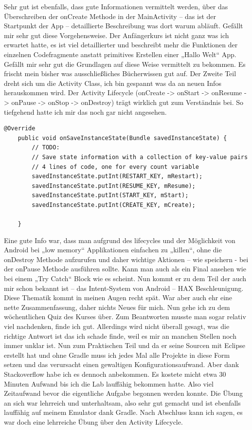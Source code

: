 \documentclass[12pt,a4paper,bibliography=totocnumbered,listof=totocnumbered]{scrartcl}
\begin{document}
Sehr gut ist ebenfalls, dass gute Informationen vermittelt werden, über das Überschreiben der onCreate Methode in der MainActivity – das ist der Startpunkt der App – detaillierte Beschreibung was dort warum abläuft. Gefällt mir sehr gut diese Vorgehensweise. 
Der Anfängerkurs ist nicht ganz was ich erwartet hatte, es ist viel detaillierter und beschreibt mehr die Funktionen der einzelnen Codefragmente anstatt primitives Erstellen einer „Hallo Welt“ App. Gefällt mir sehr gut die Grundlagen auf diese Weise vermittelt zu bekommen. Es frischt mein bisher was ausschließliches Bücherwissen gut auf. 
Der Zweite Teil dreht sich um die Activity Class, ich bin gespannt was da an neuen Infos herauskommen wird. Der Activity Lifecycle (onCreate -> onStart -> onResume -> onPause -> onStop -> onDestroy) trägt wirklich gut zum Verständnis bei. So tiefgehend hatte ich mir das noch gar nicht angesehen. 

\vspace{1em}
\begin{lstlisting}[caption=Activity Lifecycle Beispiel, label=lst:Activity Lifecycle]
@Override
    public void onSaveInstanceState(Bundle savedInstanceState) {
        // TODO:
        // Save state information with a collection of key-value pairs
        // 4 lines of code, one for every count variable
        savedInstanceState.putInt(RESTART_KEY, mRestart);
        savedInstanceState.putInt(RESUME_KEY, mResume);
        savedInstanceState.putInt(START_KEY, mStart);
        savedInstanceState.putInt(CREATE_KEY, mCreate);

    }
\end{lstlisting}

Eine gute Info war, dass man aufgrund des lifecycles und der Möglichkeit von Android bei „low memory“ Applikationen einfachen zu „killen“, ohne die onDestroy Methode aufzurufen und daher wichtige Aktionen – wie speichern - bei der onPause Methode ausführen sollte. Kann man auch als ein Final ansehen wie bei einem „Try Catch“ Block wie es scheint. Nun kommt er zu dem Teil der auch mir schon bekannt ist – das Intent-System von Android – HAX Beschleunigung. Diese Thematik kommt in meinen Augen recht spät. War aber auch ehr eine nette Zusammenfassung, daher nichts Neues für mich. 
Nun gehe ich zu dem wöchentlichen Quiz des Kurses über. Zum Beantworten musste man sogar relativ viel nachdenken, finde ich gut. Allerdings wird nicht überall gesagt, was die richtige Antwort ist das ich schade finde, weil es mir an manchen Stellen noch immer unklar ist. 
Nun zum Praktischen Teil und da er seine Sourcen mit Eclipse erstellt hat und ohne Gradle muss ich jedes Mal alle Projekte in diese Form setzen und das verursacht einen gewaltigen Konfigurationsaufwand. 
Aber dank Stackoverflow habe ich es dennoch anbekommen. Es kostete micht etwa 30 Minuten Aufwand bis ich die Lab lauffähig bekommen hatte.  Also viel Zeitaufwand bevor die eigentliche Aufgabe begonnen werden konnte. 
Die Übung an sich war lehrreich und unterhaltsam, also sehr gut gemacht und ist ebenfalls lauffähig auf meinem Emulator dank Gradle. 
Nach Abschluss kann ich sagen, es war doch eine lehrreiche Übung über den Activity Lifecycle. 
\end{document}
